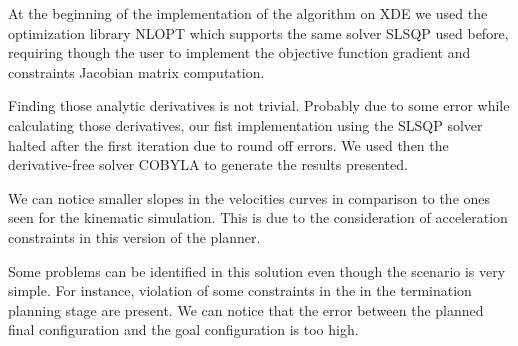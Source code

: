 At the beginning of the implementation of the algorithm on XDE we used the optimization library NLOPT which supports the same solver SLSQP used before, requiring though the user to implement the objective function gradient and constraints Jacobian matrix computation.

Finding those analytic derivatives is not trivial. Probably due to some error while calculating those derivatives, our fist implementation using the SLSQP solver halted after the first iteration due to round off errors.
We used then the derivative-free solver COBYLA to generate the results presented.

We can notice smaller slopes in the velocities curves in comparison to the ones seen for the kinematic simulation. This is due to the consideration of acceleration constraints in this version of the planner.

Some problems can be identified in this solution even though the scenario is very simple. For instance, violation of some constraints in the in the termination planning stage are present. We can notice that the error between the planned final configuration and the goal configuration is too high.


%
%
%



